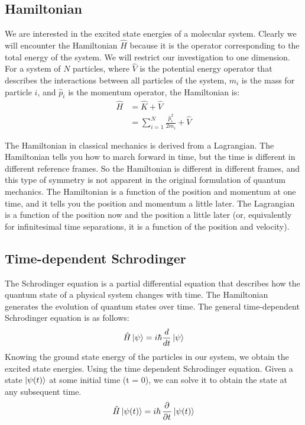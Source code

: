 \documentclass[12pt,letterpaper,oneside,final,titlepage]{article}               %
\numberwithin{equation}{section} %
\begin{document}
\newpage

\subsection{Hamiltonian}
We are interested in the excited state energies of a molecular system.
Clearly we will encounter the Hamiltonian $\hat{H}$ because it is the operator corresponding to the total energy of the system.
We will restrict our investigation to one dimension. 
For a system of $N$ particles, where $\hat{V}$ is the potential energy operator that describes the interactions between 
all particles of the system, $m_{i}$ is the mass for particle $i$, and $\hat{p}_{i}$ is the momentum operator, the Hamiltonian is:
\begin{align}
    \hat{H} &= \hat{K} + \hat{V}
    \\      &= \sum_{i=1}^{N}\frac{\hat{p}_{i}^2}{2m_{i}} + \hat{V}
\end{align}

The Hamiltonian in classical mechanics is derived from a Lagrangian. 
The Hamiltonian tells you how to march forward in time, but the time is different in different reference frames. 
So the Hamiltonian is different in different frames, and this type of symmetry is not apparent in the original formulation of quantum mechanics.
The Hamiltonian is a function of the position and momentum at one time, and it tells you the position and momentum a little later. 
The Lagrangian is a function of the position now and the position a little later (or, equivalently for infinitesimal time separations, it is a function of the position and velocity). 


\subsection{Time-dependent Schrodinger}
The Schrodinger equation is a partial differential equation that describes how the quantum state of a physical system changes with time. 
The Hamiltonian generates the evolution of quantum states over time. 
The general time-dependent Schrodinger equation is as follows:
\begin{equation}
    \hat{H}\ket{\psi} = i\hbar\frac{d}{dt}\ket{\psi}
\end{equation}
Knowing the ground state energy of the particles in our system, we obtain the excited state energies.
Using the time dependent Schrodinger equation.
Given a state $\ket{\psi(t)}$ at some initial time (t = 0), we can solve it to obtain the state at any subsequent time.
\begin{equation}
    \hat{H}\ket{\psi(t)} = i\hbar\dpd{}{t}\ket{\psi(t)}  
\end{equation}
\end{document}
